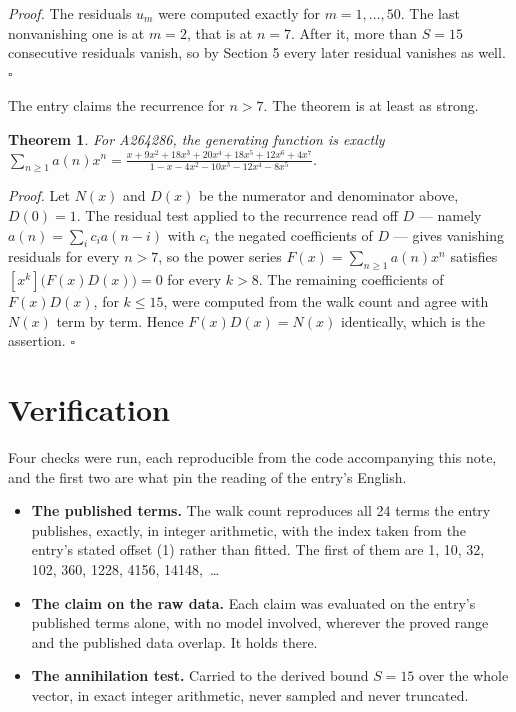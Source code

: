 \documentclass[11pt]{article}
\newtheorem{theorem}{Theorem}
\theoremstyle{definition}
\begin{document}
{\itshape Proof.} The residuals $u_m$ were computed exactly for $m = 1,\dots,50$. The last nonvanishing one is at $m = 2$, that is at $n = 7$. After it, more than $S = 15$ consecutive residuals vanish, so by Section 5 every later residual vanishes as well. $\square$

The entry claims the recurrence for $n > 7$. The theorem is at least as strong.

\begin{theorem} For A264286, the generating function is exactly $\sum_{n\ge 1} a(n)x^n = \frac{x + 9x^{2} + 18x^{3} + 20x^{4} + 18x^{5} + 12x^{6} + 4x^{7}}{1 - x - 4x^{2} - 10x^{3} - 12x^{4} - 8x^{5}}$.\end{theorem}

{\itshape Proof.} Let $N(x)$ and $D(x)$ be the numerator and denominator above, $D(0)=1$. The residual test applied to the recurrence read off $D$ --- namely $a(n) = \sum_i c_i a(n-i)$ with $c_i$ the negated coefficients of $D$ --- gives vanishing residuals for every $n > 7$, so the power series $F(x)=\sum_{n\ge 1}a(n)x^n$ satisfies $[x^k]\bigl(F(x)D(x)\bigr) = 0$ for every $k > 8$. The remaining coefficients of $F(x)D(x)$, for $k \le 15$, were computed from the walk count and agree with $N(x)$ term by term. Hence $F(x)D(x) = N(x)$ identically, which is the assertion. $\square$

\section{Verification}

Four checks were run, each reproducible from the code accompanying this note, and the first two are what pin the reading of the entry's English.

\begin{itemize}

\item {\bfseries The published terms.} The walk count reproduces all 24 terms the entry publishes, exactly, in integer arithmetic, with the index taken from the entry's stated offset (1) rather than fitted. The first of them are 1, 10, 32, 102, 360, 1228, 4156, 14148,~\dots

\item {\bfseries The claim on the raw data.} Each claim was evaluated on the entry's published terms alone, with no model involved, wherever the proved range and the published data overlap. It holds there.

\item {\bfseries The annihilation test.} Carried to the derived bound $S = 15$ over the whole vector, in exact integer arithmetic, never sampled and never truncated.

\end{itemize}
\end{document}
